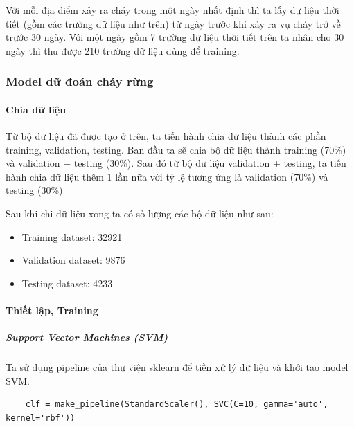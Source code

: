 \documentclass{article}
\begin{document}
Với mỗi địa diểm xảy ra cháy trong một ngày nhất định thì ta lấy dữ liệu thời tiết (gồm các trường dữ liệu như trên) từ ngày trước khi xảy ra vụ cháy trở về trước 30 ngày. Với một ngày gồm 7 trường dữ liệu thời tiết trên ta nhân cho 30 ngày thì thu được 210 trường dữ liệu dùng để training.


\subsubsection{Model dữ đoán cháy rừng}
\paragraph{Chia dữ liệu}


Từ bộ dữ liệu đã được tạo ở trên, ta tiến hành chia dữ liệu thành các phần training, validation, testing. Ban đầu ta sẽ chia bộ dữ liệu thành training (70\%) và validation + testing (30\%). Sau đó từ bộ dữ liệu validation + testing, ta tiến hành chia dữ liệu thêm 1 lần nữa với tỷ lệ tương ứng là validation (70\%) và testing (30\%)

Sau khi chi dữ liệu xong ta có số lượng các bộ dữ liệu như sau:

\begin{itemize}
	\item Training dataset: 32921
	\item Validation dataset: 9876
	\item Testing dataset: 4233
\end{itemize}

\paragraph{Thiết lập, Training}
\subparagraph{Support Vector Machines (SVM)}


Ta sử dụng pipeline của thư viện sklearn để tiền xử lý dữ liệu và khởi tạo model SVM.

\begin{verbatim}
	clf = make_pipeline(StandardScaler(), SVC(C=10, gamma='auto', kernel='rbf'))
\end{verbatim}
\end{document}
